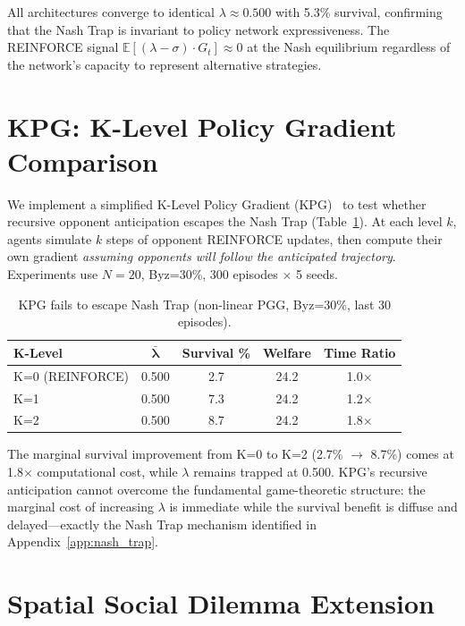 \documentclass{article}
\begin{document}
\noindent All architectures converge to identical $\lambda \approx 0.500$ with 5.3\% survival, confirming that the Nash Trap is invariant to policy network expressiveness.
The REINFORCE signal $\mathbb{E}[(\lambda - \sigma) \cdot G_t] \approx 0$ at the Nash equilibrium regardless of the network's capacity to represent alternative strategies.

\section{KPG: K-Level Policy Gradient Comparison}
\label{app:kpg}

We implement a simplified K-Level Policy Gradient (KPG)~\citep{somani2024kpg} to test whether recursive opponent anticipation escapes the Nash Trap (Table~\ref{tab:kpg}).
At each level $k$, agents simulate $k$ steps of opponent REINFORCE updates, then compute their own gradient \emph{assuming opponents will follow the anticipated trajectory}.
Experiments use $N{=}20$, Byz=30\%, 300 episodes $\times$ 5 seeds.

\begin{table}[h]
\centering
\caption{KPG fails to escape Nash Trap (non-linear PGG, Byz=30\%, last 30 episodes).}
\label{tab:kpg}
\begin{tabular}{lcccc}
\toprule
\textbf{K-Level} & $\boldsymbol{\bar{\lambda}}$ & \textbf{Survival \%} & \textbf{Welfare} & \textbf{Time Ratio} \\
\midrule
K=0 (REINFORCE) & 0.500 & 2.7 & 24.2 & 1.0$\times$ \\
K=1 & 0.500 & 7.3 & 24.2 & 1.2$\times$ \\
K=2 & 0.500 & 8.7 & 24.2 & 1.8$\times$ \\
\bottomrule
\end{tabular}
\end{table}

\noindent The marginal survival improvement from K=0 to K=2 (2.7\% $\to$ 8.7\%) comes at 1.8$\times$ computational cost, while $\lambda$ remains trapped at 0.500.
KPG's recursive anticipation cannot overcome the fundamental game-theoretic structure: the marginal cost of increasing $\lambda$ is immediate while the survival benefit is diffuse and delayed---exactly the Nash Trap mechanism identified in Appendix~\ref{app:nash_trap}.

\section{Spatial Social Dilemma Extension}
\label{app:spatial}
\end{document}
